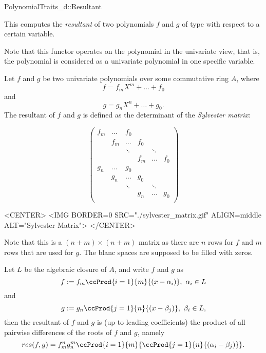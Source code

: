 \begin{ccRefConcept}{PolynomialTraits_d::Resultant}
\ccDefinition

This  computes the {\em resultant} of two polynomials 
$f$ and $g$ of type  with respect to a 
certain variable.
 
Note that this functor operates on the polynomial in the univariate view, 
that is, the polynomial is considered as a univariate polynomial in one 
specific variable. 

Let $f$ and $g$ be two univariate polynomials over some commutative ring $A$, 
where 
\[f = f_mX^m + \dots + f_0\] and 
\[g = g_nX^n + \dots + g_0.\] 
The resultant of $f$ and $g$ is defined as the determinant of the {\em Sylvester matrix}: 

\begin{ccTexOnly}
\[ \left( \begin{array}{cccccccc}
f_m & \dots & f_0&&& \\
&f_m & \dots & f_0&&\\
&&\ddots&&\ddots&\\
&&&f_m &\dots& f_0\\  
g_n & \dots & g_0&&& \\
&g_n & \dots & g_0&&\\
&&\ddots&&\ddots&\\
&&&g_n & \dots& g_0\\  
\end{array} \right) \]
\end{ccTexOnly}

\begin{ccHtmlOnly}
<CENTER>
<IMG BORDER=0 SRC="./sylvester_matrix.gif" ALIGN=middle ALT="Sylvester Matrix">
</CENTER>
\end{ccHtmlOnly}

Note that this is a $(n+m)\times(n+m)$ matrix as there are $n$ rows for $f$ 
and $m$ rows that are used for $g$. The blanc spaces are supposed to be 
filled with zeros. 


\begin{ccAdvanced}
Let $L$ be the algebraic closure of $A$, and write $f$ and $g$ as 
\[f := f_m \ccProd{i=1}{m}{(x-\alpha_i)},\ \alpha_i \in L \]
and 
\[g :=  g_n \ccProd{j=1}{n}{(x-\beta_j)},\ \beta_i \in L,\] then
the resultant of $f$ and $g$ is (up to leading coefficients) 
the product of all pairwise differences of the roots of $f$ and $g$, namely 
\[res(f,g) = f_m^n g_n^m \ccProd{i=1}{m}{\ccProd{j=1}{n}{(\alpha_i-\beta_j)}}.\] 
\end{ccAdvanced}


\end{ccRefConcept}
